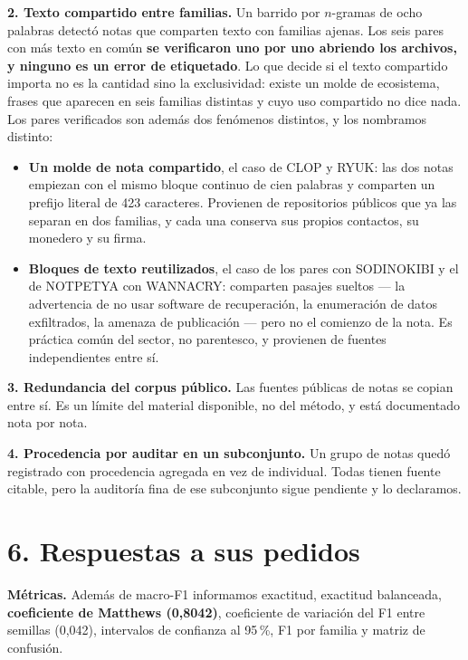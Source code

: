 \documentclass[11pt,a4paper]{article}
\begin{document}
\textbf{2. Texto compartido entre familias.} Un barrido por $n$-gramas de ocho palabras detectó
notas que comparten texto con familias ajenas. Los seis pares con más texto en común \textbf{se
verificaron uno por uno abriendo los archivos, y ninguno es un error de etiquetado}. Lo que decide
si el texto compartido importa no es la cantidad sino la exclusividad: existe un molde de
ecosistema, frases que aparecen en seis familias distintas y cuyo uso compartido no dice nada. Los
pares verificados son además dos fenómenos distintos, y los nombramos distinto:

\begin{itemize}\setlength{\itemsep}{0.15em}
  \item \textbf{Un molde de nota compartido}, el caso de CLOP y RYUK: las dos notas empiezan con el
        mismo bloque continuo de cien palabras y comparten un prefijo literal de 423 caracteres.
        Provienen de repositorios públicos que ya las separan en dos familias, y cada una conserva
        sus propios contactos, su monedero y su firma.
  \item \textbf{Bloques de texto reutilizados}, el caso de los pares con SODINOKIBI y el de NOTPETYA
        con WANNACRY: comparten pasajes sueltos --- la advertencia de no usar software de
        recuperación, la enumeración de datos exfiltrados, la amenaza de publicación --- pero no el
        comienzo de la nota. Es práctica común del sector, no parentesco, y provienen de fuentes
        independientes entre sí.
\end{itemize}

\textbf{3. Redundancia del corpus público.} Las fuentes públicas de notas se copian entre sí. Es un
límite del material disponible, no del método, y está documentado nota por nota.

\textbf{4. Procedencia por auditar en un subconjunto.} Un grupo de notas quedó registrado con
procedencia agregada en vez de individual. Todas tienen fuente citable, pero la auditoría fina de
ese subconjunto sigue pendiente y lo declaramos.

\section*{6. Respuestas a sus pedidos}

\textbf{Métricas.} Además de macro-F1 informamos exactitud, exactitud balanceada, \textbf{coeficiente
de Matthews (0,8042)}, coeficiente de variación del F1 entre semillas (0,042), intervalos de
confianza al 95\,\%, F1 por familia y matriz de confusión.
\end{document}
